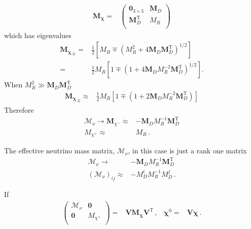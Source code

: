 \begin{align}
  \boldsymbol{M_{\chi}}=& \begin{pmatrix}
   \mathbf{0}_{3 \times 3} &            \boldsymbol{M}_D \\
   \boldsymbol{M}_D^{\operatorname{T}} & M_R \\
 \end{pmatrix}
\end{align}
which has eigenvalues
\begin{align}
{  \boldsymbol{M_{\chi}}}_\mp=&\frac{1}{2} \left[ M_R \mp \left( M_R^2 + 4   \boldsymbol{M}_D   \boldsymbol{M}_D^{\operatorname{T}}  \right)^{1/2} \right] \nonumber\\
  =&\frac{1}{2} M_R\left[ 1 \mp  \left( 1 + 4   \boldsymbol{M}_D M_R^{-2}   \boldsymbol{M}_D ^{\operatorname{T}}  \right)^{1/2} \right].
\end{align}
When $M_R^2 \gg \boldsymbol{M}_D  \boldsymbol{M}_D ^{\operatorname{T}} $
\begin{align}
  { \boldsymbol{M_{\chi}}}_\mp\approx &\frac{1}{2} M_R\left[ 1 \mp  \left( 1 +   2 \boldsymbol{M}_D M_R^{-2}   \boldsymbol{M}_D^{\operatorname{T}}  \right)
   \right]
\end{align}
Therefore
\begin{align}
 \boldsymbol{\mathcal{M}}_{\nu}\to {\boldsymbol{M}_{\chi^-} }\approx&-   \boldsymbol{M}_D M_R^{-1}   \boldsymbol{M}_D^{\operatorname{T}}  \nonumber\\
 M_{\chi^+} \approx&    M_R\,.
\end{align}

The effective neutrino mass matrix, $\boldsymbol{\mathcal{M}}_{\nu}$,  in this case   is just a rank one matrix
\begin{align}
  \boldsymbol{\mathcal{M}}_{\nu}\to&- \boldsymbol{M}_D M_R^{-1} \boldsymbol{M}_D^{\operatorname{T}}\nonumber\\
  \left( {\mathcal{M}}_{\nu} \right)_{ij}\approx&- M_D^i M_R^{-1} M_D^{j}\,.
\end{align}

If
\begin{align}
  \begin{pmatrix}
    \boldsymbol{\mathcal{M}}_{\nu} & \boldsymbol{0} \\
    \boldsymbol{0} & M_{\chi^{+}}\\
  \end{pmatrix}
  = &\boldsymbol{V}\boldsymbol{M_{\chi}}\boldsymbol{V}^{\operatorname{T}}\,,&
      \boldsymbol{\chi}^{0}=&\boldsymbol{V}   \boldsymbol{\chi}\,.
\end{align}

